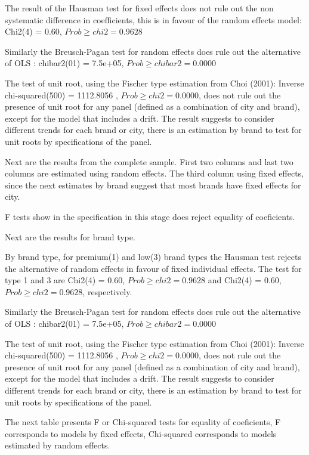 \documentclass[]{article}
\begin{document}
The result of the Hausman test for fixed effects does not rule out the non systematic difference in coefficients, this is in favour of the random effects model: Chi2(4) =  0.60,
$Prob \geq chi2 =    0.9628$

Similarly the Breusch-Pagan test for random effects does rule out the alternative of OLS : chibar2(01) =  7.5e+05,
$Prob \geq chibar2 =    0.0000$

The test of unit root, using the Fischer type estimation from Choi (2001): 
Inverse chi-squared(500) = 1112.8056 , $Prob \geq chi2 =    0.0000$, does not rule out the presence of unit root for any panel (defined as a combination of city and brand), except for the model that includes a drift. The result suggests to consider different trends for each brand or city, there is an estimation by brand to test for unit roots by specifications of the panel.

Next are the results from the complete sample.
First two columns and last two columns are estimated using random effects. The third column using fixed effects, since the next estimates by brand suggest that most brands have fixed effects for city.



F tests show in the specification in this stage does reject equality of coeficients. 

Next are the results for brand type.


By brand type, for premium(1) and low(3) brand types the Hausman test rejects the alternative of random effects in favour of fixed individual effects. The test for type 1 and 3 are Chi2(4) =  0.60,
$Prob \geq chi2 =    0.9628$ and Chi2(4) =  0.60,
$Prob \geq chi2 =    0.9628$, respectively.

Similarly the Breusch-Pagan test for random effects does rule out the alternative of OLS : chibar2(01) =  7.5e+05,
$Prob \geq chibar2 =    0.0000$

The test of unit root, using the Fischer type estimation from Choi (2001): 
Inverse chi-squared(500) = 1112.8056 , $Prob \geq chi2 =    0.0000$, does not rule out the presence of unit root for any panel (defined as a combination of city and brand), except for the model that includes a drift. The result suggests to consider different trends for each brand or city, there is an estimation by brand to test for unit roots by specifications of the panel.

The next table presents F or Chi-squared tests for equality of coeficients, F corresponds to models by fixed effects, Chi-squared corresponds to models estimated by random effects.
\end{document}
